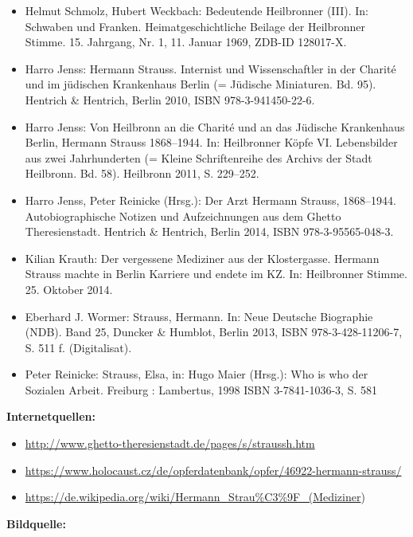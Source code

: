 \documentclass[a4paper]{article}
\begin{document}
\begin{itemize}
\item Helmut Schmolz, Hubert Weckbach: Bedeutende Heilbronner (III). In: Schwaben und Franken. Heimatgeschichtliche
Beilage der Heilbronner Stimme. 15. Jahrgang, Nr. 1, 11. Januar 1969, ZDB-ID 128017-X.  
\item Harro Jenss: Hermann Strauss. Internist und Wissenschaftler in der Charité und im jüdischen Krankenhaus Berlin (=
Jüdische Miniaturen. Bd. 95). Hentrich \& Hentrich, Berlin 2010, ISBN 978-3-941450-22-6.  
\item Harro Jenss: Von Heilbronn an die Charité und an das Jüdische Krankenhaus Berlin, Hermann Strauss 1868–1944. In:
Heilbronner Köpfe VI. Lebensbilder aus zwei Jahrhunderten (= Kleine Schriftenreihe des Archivs der Stadt Heilbronn. Bd.
58). Heilbronn 2011, S. 229–252.  
\item Harro Jenss, Peter Reinicke (Hrsg.): Der Arzt Hermann Strauss, 1868–1944. Autobiographische Notizen und
Aufzeichnungen aus dem Ghetto Theresienstadt. Hentrich \& Hentrich, Berlin 2014, ISBN 978-3-95565-048-3.  
\item Kilian Krauth: Der vergessene Mediziner aus der Klostergasse. Hermann Strauss machte in Berlin Karriere und endete
im KZ. In: Heilbronner Stimme. 25. Oktober 2014.  
\item Eberhard J. Wormer: Strauss, Hermann. In: Neue Deutsche Biographie (NDB). Band 25, Duncker \& Humblot, Berlin
2013, ISBN 978-3-428-11206-7, S. 511 f. (Digitalisat).  
\item Peter Reinicke: Strauss, Elsa, in: Hugo Maier (Hrsg.): Who is who der Sozialen Arbeit. Freiburg : Lambertus, 1998
ISBN 3-7841-1036-3, S. 581
\end{itemize}

\bigskip


\bigskip

\textbf{Internetquellen:}

\begin{itemize}
\item \url{http://www.ghetto-theresienstadt.de/pages/s/straussh.htm} 
\item \url{https://www.holocaust.cz/de/opferdatenbank/opfer/46922-hermann-strauss/} 
\item \url{https://de.wikipedia.org/wiki/Hermann_Strau%C3%9F_(Mediziner}) 
\end{itemize}

\bigskip

\textbf{Bildquelle:}
\end{document}
